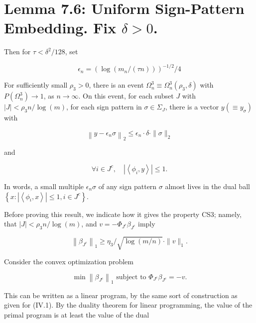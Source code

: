 \documentclass[10pt]{article}
\begin{document}
\section*{Lemma 7.6: Uniform Sign-Pattern Embedding. Fix $\delta>0$.}
Then for $\tau<\delta^{2} / 128$, set


\begin{equation*}
\epsilon_{n}=\left(\log \left(m_{n} /(\tau n)\right)\right)^{-1 / 2} / 4 \tag{VII.4}
\end{equation*}


For sufficiently small $\rho_{3}>0$, there is an event $\Omega_{n}^{3} \equiv \Omega_{n}^{3}\left(\rho_{3}, \delta\right)$ with $P\left(\Omega_{n}^{3}\right) \rightarrow 1$, as $n \rightarrow \infty$. On this event, for each subset $J$ with $|J|<\rho_{3} n / \log (m)$, for each sign pattern in $\sigma \in \Sigma_{J}$, there is a vector $y\left(\equiv y_{\sigma}\right)$ with


\begin{equation*}
\left\|y-\epsilon_{n} \sigma\right\|_{2} \leq \epsilon_{n} \cdot \delta \cdot\|\sigma\|_{2} \tag{VII.5}
\end{equation*}


and


\begin{equation*}
\forall i \in J^{c}, \quad\left|\left\langle\phi_{i}, y\right\rangle\right| \leq 1 . \tag{VII.6}
\end{equation*}


In words, a small multiple $\epsilon_{n} \sigma$ of any sign pattern $\sigma$ almost lives in the dual ball $\left\{x:\left|\left\langle\phi_{i}, x\right\rangle\right| \leq 1, i \in J^{c}\right\}$.

Before proving this result, we indicate how it gives the property CS3; namely, that $|J|<\rho_{3} n / \log (m)$, and $v=-\Phi_{J^{c}} \beta_{J^{c}}$ imply


\begin{equation*}
\left\|\beta_{J^{c}}\right\|_{1} \geq \eta_{3} / \sqrt{\log (m / n)} \cdot\|v\|_{1} . \tag{VII.7}
\end{equation*}


Consider the convex optimization problem


\begin{equation*}
\min \left\|\beta_{J^{c}}\right\|_{1} \text { subject to } \Phi_{J^{c}} \beta_{J^{c}}=-v . \tag{VII.8}
\end{equation*}


This can be written as a linear program, by the same sort of construction as given for (IV.1). By the duality theorem for linear programming, the value of the primal program is at least the value of the dual
\end{document}

